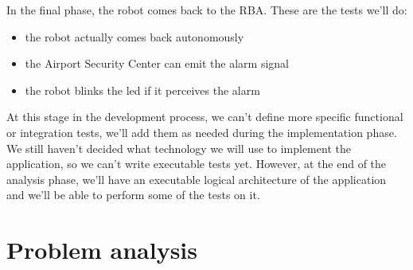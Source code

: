 \documentclass{llncs}
\newcommand{\labelsec}[1]{\label{sec:#1}}
\begin{document}
In the final phase, the robot comes back to the RBA. These are the tests we'll do:
\begin{itemize}
\item the robot actually comes back autonomously
\item the Airport Security Center can emit the alarm signal
\item the robot blinks the led if it perceives the alarm
\end{itemize}
At this stage in the development process, we can't define more specific functional or integration tests, we'll add them as needed during the implementation phase.
We still haven't decided what technology we will use to implement the application, so we can't write executable tests yet. However, at the end of the analysis phase, we'll have an executable logical architecture of the application and we'll be able to perform some of the tests on it.

\section{Problem analysis}
\labelsec{ProblemAnalysis}
\end{document}
